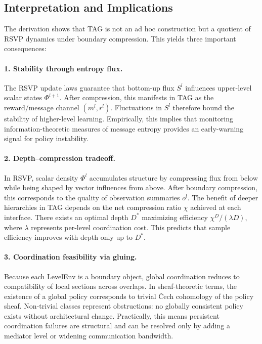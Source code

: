 \documentclass[11pt,a4paper]{article}
\begin{document}
\subsection{Interpretation and Implications}

The derivation shows that TAG is not an ad hoc construction but a quotient of RSVP
dynamics under boundary compression. This yields three important consequences:

\paragraph{1. Stability through entropy flux.}
The RSVP update laws guarantee that bottom-up flux $S^l$ influences upper-level
scalar states $\Phi^{l+1}$. After compression, this manifests in TAG as the
reward/message channel $(m^l,r^l)$. Fluctuations in $S^l$ therefore bound the
stability of higher-level learning. Empirically, this implies that monitoring
information-theoretic measures of message entropy provides an early-warning
signal for policy instability.

\paragraph{2. Depth--compression tradeoff.}
In RSVP, scalar density $\Phi^l$ accumulates structure by compressing flux from
below while being shaped by vector influences from above. After boundary
compression, this corresponds to the quality of observation summaries $o^l$.
The benefit of deeper hierarchies in TAG depends on the net compression ratio
$\chi$ achieved at each interface. There exists an optimal depth $D^\ast$
maximizing efficiency $\chi^D/(\lambda D)$, where $\lambda$ represents
per-level coordination cost. This predicts that sample efficiency improves with
depth only up to $D^\ast$.

\paragraph{3. Coordination feasibility via gluing.}
Because each LevelEnv is a boundary object, global coordination reduces to
compatibility of local sections across overlaps. In sheaf-theoretic terms, the
existence of a global policy corresponds to trivial Čech cohomology of the
policy sheaf. Non-trivial classes represent obstructions: no globally consistent
policy exists without architectural change. Practically, this means persistent
coordination failures are structural and can be resolved only by adding a
mediator level or widening communication bandwidth.
\end{document}

